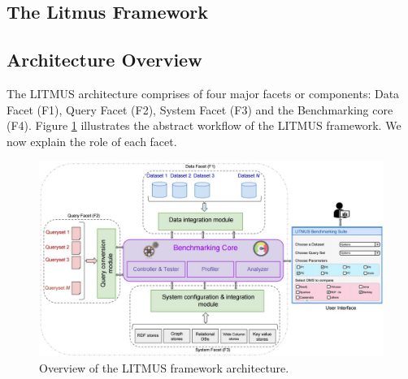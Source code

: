 \documentclass{llncs}
\newcommand{\todoinline}[1]{
    \todo[inline]{#1}
}
\begin{document}
\begin{itemize}[nosep]
\section{The Litmus Framework}\label{litmus_framework}
        

    \subsection{Architecture Overview}
        The LITMUS architecture comprises of four major facets or components: Data Facet (F1), Query Facet (F2), System Facet (F3) and the Benchmarking core (F4). Figure \ref{fig:benchmark_arch} illustrates the abstract workflow of the LITMUS framework. We now explain the role of each facet. 
         
        \begin{figure}[h]
            \centering
            \includegraphics[scale=0.18]{images/benchmark_arch_latest_new}
            \caption{Overview of the LITMUS framework architecture.}
            \label{fig:benchmark_arch}
        \end{figure}
        

\end{itemize}
\end{document}

